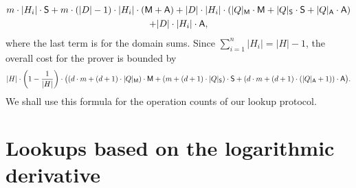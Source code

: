 \documentclass[11pt]{article}
\theoremstyle{definition}
\theoremstyle{definition}
\begin{document}
\begin{multline*}
m\cdot |H_i|\cdot \textsf S + m \cdot (|D| - 1)\cdot |H_{i}| \cdot (\textsf M + \textsf A)
+  |D|\cdot |H_{i}| \cdot ( |Q|_\textsf M \cdot \textsf{M} +   |Q|_\textsf S \cdot \textsf S + |Q|_\textsf A \cdot \textsf A) 
\\
+ |D|\cdot |H_{i}| \cdot \textsf A,
\end{multline*}
where the last term is for the domain sums.
Since $\sum_{i=1}^{n} |H_{i}| = |H| - 1$, the overall cost for the prover is bounded by 
\begin{equation}
\label{e:sumcheck:cost:precise}
|H|\cdot \left(1-\frac{1}{|H|}\right)\cdot \big( (d\cdot m + (d+1)\cdot |Q|_\textsf M)\cdot\textsf M +
 (m + (d + 1)\cdot |Q|_\textsf S) \cdot\textsf S +
(d\cdot m + (d+1)\cdot (|Q|_\textsf A + 1))\cdot\textsf A
\big).
\end{equation}
We shall use this formula for the operation counts of our lookup protocol.






\section{Lookups based on the logarithmic derivative}
\label{s:lookups}
\end{document}
